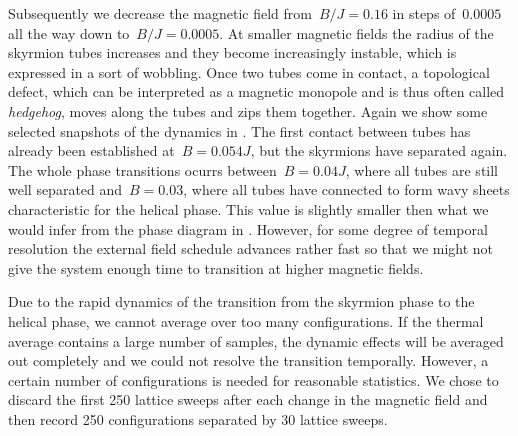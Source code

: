 Subsequently we decrease the magnetic field from~$B/J=0.16$ in steps of~$0.0005$
all the way down to~$B/J=0.0005$. At smaller magnetic fields the radius of the
skyrmion tubes increases and they become increasingly instable, which is
expressed in a sort of wobbling. Once two tubes come in
contact, a topological defect, which can be interpreted as a magnetic monopole
and is thus often called \emph{hedgehog}, moves along the tubes and zips them
together. Again we show some selected snapshots of the dynamics in
. The first contact between tubes has already been
established at~$B=0.054 J$, but the skyrmions have separated again. The whole
phase transitions ocurrs between~$B= 0.04 J$, where all tubes are still well
separated and~$B= 0.03$, where all tubes have connected to form wavy sheets
characteristic for the helical phase. This value is slightly smaller then what
we would infer from the phase diagram in . However, for some
degree of temporal resolution the external field schedule advances rather fast
so that we might not give the system enough time to transition at higher
magnetic fields.

Due to the rapid dynamics of the transition from the skyrmion phase to the
helical phase, we cannot average over too many configurations. If the thermal
average contains a large number of samples, the dynamic effects will be averaged
out completely and we could not resolve the transition temporally. However, a
certain number of configurations is needed for reasonable statistics. We chose
to discard the first 250 lattice sweeps after each change in the magnetic field
and then record 250 configurations separated by 30 lattice sweeps.

